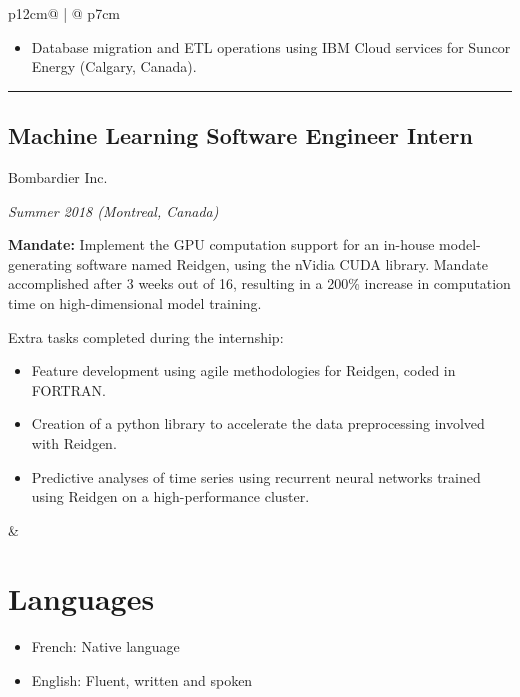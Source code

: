 \documentclass[letterpaper, 11pt]{article}
\begin{document}
\begin{tabular}{p{12cm}@{\hspace{1em}} | @{\hspace{1em}} p{7cm}}
\begin{adjustwidth}{1em}{1em}
\begin{itemize}
                    \item Database migration and ETL operations using IBM Cloud services for Suncor Energy (Calgary, Canada).
                \end{itemize}
            {\color{lightgray}\rule{\linewidth}{1pt}}           \end{adjustwidth}
            
        \subsection*{Machine Learning Software Engineer Intern}
            \hspace{1em} {\large Bombardier Inc.}
            
            \hspace{2em} \textit{Summer 2018 (Montreal, Canada)}
            \vspace{0.5em}
            \begin{adjustwidth}{1em}{1em}
                \textbf{Mandate:} Implement the GPU computation support for an in-house model-generating software named Reidgen, using the nVidia CUDA library. Mandate accomplished after 3 weeks out of 16, resulting in a 200\% increase in computation time on high-dimensional model training.
                \vspace{3pt}
            
                Extra tasks completed during the internship:
                \begin{itemize}
                    \item Feature development using agile methodologies for Reidgen, coded in FORTRAN.
                    \item Creation of a python library to accelerate the data preprocessing involved with Reidgen.
            
                    \item Predictive analyses of time series using recurrent neural networks trained using Reidgen on a high-performance cluster.
                \end{itemize}
           \end{adjustwidth}
        
    & %
    
    \section*{Languages}
        \begin{itemize}
            \item French: Native language
            \item English: Fluent, written and spoken
        \end{itemize}
        \vspace{1em}

\end{tabular}
\end{document}

